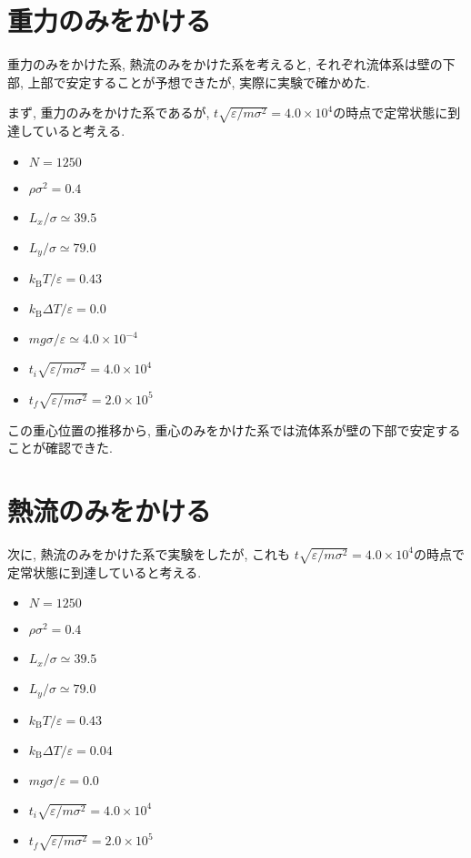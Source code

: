 \section{重力のみをかける}\label{sec:dT0}

重力のみをかけた系, 熱流のみをかけた系を考えると, それぞれ流体系は壁の下部, 上部で安定することが予想できたが, 実際に実験で確かめた. 

まず, 重力のみをかけた系であるが, $t \sqrt{\varepsilon / m \sigma^2}= 4.0 \times 10^4$の時点で定常状態に到達していると考える. 

\begin{itemize}
  \item $N = 1250$
  \item $\rho {\sigma}^2 = 0.4$
  \item $L_x / \sigma \simeq 39.5$
  \item $L_y / \sigma \simeq 79.0$
  \item $k_{\text{B}} T / \varepsilon = 0.43$
  \item $k_{\text{B}} \Delta T / \varepsilon = 0.0$
  \item $mg\sigma/\varepsilon \simeq 4.0 \times 10^{-4}$
  \item $t_i \sqrt{\varepsilon / m \sigma^2}= 4.0 \times 10^4$
  \item $t_f \sqrt{\varepsilon / m \sigma^2} = 2.0 \times 10^{5}$
\end{itemize}




この重心位置の推移から, 重心のみをかけた系では流体系が壁の下部で安定することが確認できた. 

\section{熱流のみをかける}\label{sec:g0}

次に, 熱流のみをかけた系で実験をしたが, これも $t \sqrt{\varepsilon / m \sigma^2}= 4.0 \times 10^4$の時点で定常状態に到達していると考える. 

\begin{itemize}
  \item $N = 1250$
  \item $\rho {\sigma}^2 = 0.4$
  \item $L_x / \sigma \simeq 39.5$
  \item $L_y / \sigma \simeq 79.0$
  \item $k_{\text{B}} T / \varepsilon = 0.43$
  \item $k_{\text{B}} \Delta T / \varepsilon = 0.04$
  \item $mg\sigma/\varepsilon = 0.0$
  \item $t_i \sqrt{\varepsilon / m \sigma^2}= 4.0 \times 10^4$
  \item $t_f \sqrt{\varepsilon / m \sigma^2} = 2.0 \times 10^{5}$
\end{itemize}

